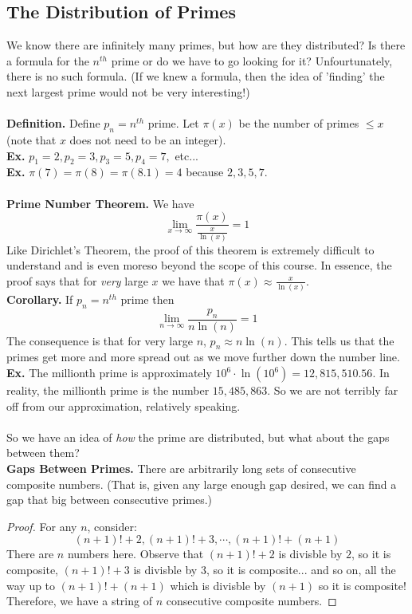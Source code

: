 \documentclass[class=article, crop=false]{standalone}
\begin{document}
\subsection{The Distribution of Primes}
We know there are infinitely many primes, but how are they distributed? Is there a formula for the $n^{th}$
prime or do we have to go looking for it? Unfourtunately, there is no such formula. (If we knew a formula,
then the idea of 'finding' the next largest prime would not be very interesting!)\\\\
\textbf{Definition.} Define $p_n=n^{th}$ prime. Let $\pi(x)$ be the number of primes $\leq x$ (note that
$x$ does not need to be an integer).\\
\textbf{Ex.} $p_1=2, p_2=3, p_3=5, p_4=7,$ etc...\\
\textbf{Ex.} $\pi(7)=\pi(8)=\pi(8.1)=4$ because $2,3,5,7$.\\\\
\textbf{Prime Number Theorem.} We have $$\lim_{x\rightarrow\infty}\frac{\pi(x)}{\frac{x}{\ln(x)}}=1$$
Like Dirichlet's Theorem, the proof of this theorem is extremely difficult to understand and is even moreso
beyond the scope of this course. In essence, the proof says that for \emph{very} large $x$ we have that
$\pi(x)\approx\frac{x}{\ln(x)}$.\\
\textbf{Corollary.} If $p_n= n^{th}$ prime then $$\lim_{n\rightarrow\infty}\frac{p_n}{n\ln(n)}=1$$
The consequence is that for very large $n$, $p_n\approx n\ln(n)$. This tells us that the primes get more and
more spread out as we move further down the number line.\\
\textbf{Ex.} The millionth prime is approximately $10^6\cdot \ln(10^6)=12,815,510.56$. In reality, the millionth
prime is the number $15,485,863$. So we are not terribly far off from our approximation, relatively speaking.\\\\
\noindent So we have an idea of \emph{how} the prime are distributed, but what about the gaps between them?\\
\textbf{Gaps Between Primes.} There are arbitrarily long sets of consecutive composite numbers. (That is, given any
large enough gap desired, we can find a gap that big between consecutive primes.)
\begin{proof}
	For any $n$, consider: $$(n+1)!+2, (n+1)!+3, \cdots, (n+1)!+(n+1)$$
	There are $n$ numbers here. Observe that $(n+1)!+2$ is divisble by $2$, so it is composite,
	$(n+1)!+3$ is divisble by $3$, so it is composite... and so on, all the way up to $(n+1)! + (n+1)$
	which is divisble by $(n+1)$ so it is composite! Therefore, we have a string of $n$ consecutive composite numbers.
\end{proof}
\end{document}
